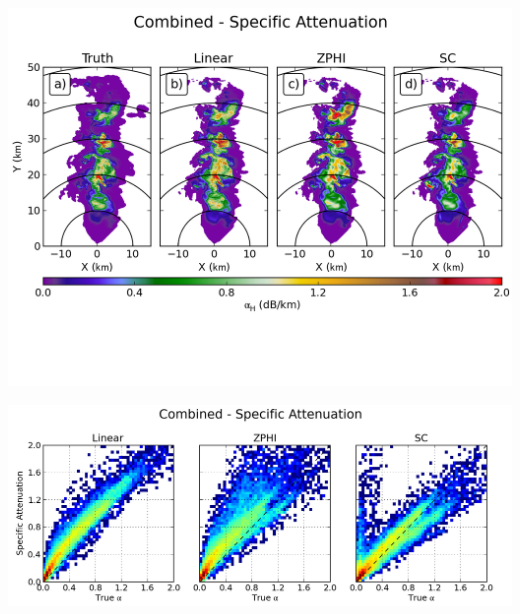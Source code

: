 \documentclass[red]{beamer}
\begin{document}
\begin{frame}
	\begin{center}
		\includegraphics[scale=0.55]{figures/C_Combined_Specific_Attenuation.png}
	\end{center}
\end{frame}

\begin{frame}
	\begin{center}
		\includegraphics[scale=0.45]{figures/C_Combined_Specific_Attenuation_scatter.png}
	\end{center}
\end{frame}
\end{document}
